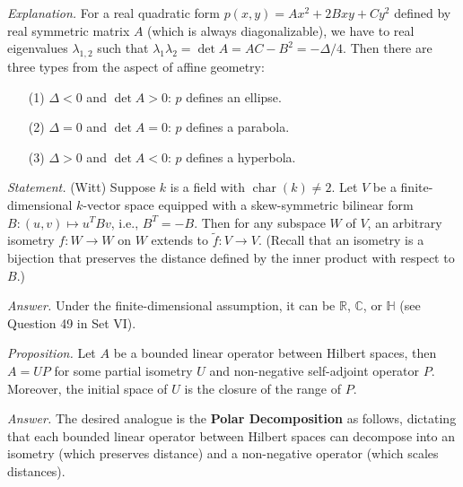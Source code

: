\documentclass{mathproblems}
\newcommand\R{\mathbb{R}}
\newcommand\C{\mathbb{C}}
\begin{document}
\begin{questions}

\textit{Explanation.} For a real quadratic form $p(x,y)=Ax^2+2Bxy+Cy^2$ defined by real symmetric matrix $A$ (which is always diagonalizable), we have to real eigenvalues $\lambda_{1,2}$ such that $\lambda_1\lambda_2=\det A=AC-B^2=-\Delta/4$. Then there are three types from the aspect of affine geometry: \vspace{-6pt}
\begin{itemize}
\item[(1)] $\Delta<0$ and $\det A>0$: $p$ defines an ellipse. \vspace{-4pt}

\item[(2)] $\Delta=0$ and $\det A=0$: $p$ defines a parabola. \vspace{-4pt}

\item[(3)] $\Delta>0$ and $\det A<0$: $p$ defines a hyperbola.
\end{itemize}



\textit{Statement.} (Witt) Suppose $k$ is a field with $\operatorname{char}(k)\neq 2$. Let $V$ be a finite-dimensional $k$-vector space equipped with a skew-symmetric bilinear form $B:(u,v)\mapsto u^T B v$, i.e., $B^T=-B$. Then for any subspace $W$ of $V$, an arbitrary isometry $f:W\to W$ on $W$ extends to $\tilde f:V\to V$. (Recall that an isometry is a bijection that preserves the distance defined by the inner product with respect to $B$.)


\textit{Answer.} Under the finite-dimensional assumption, it can be $\R$, $\C$, or $\mathbb{H}$ (see Question 49 in Set VI).


{\color{violet}\textit{Proposition.} Let $A$ be a bounded linear operator between Hilbert spaces, then $A=UP$ for some partial isometry $U$ and non-negative self-adjoint operator $P$. Moreover, the initial space of $U$ is the closure of the range of $P$.}

\textit{Answer.} The desired analogue is the {\color{violet}\textbf{Polar Decomposition}} as follows, dictating that each bounded linear operator between Hilbert spaces can decompose into an isometry (which preserves distance) and a non-negative operator (which scales distances).


\end{questions}
\end{document}
